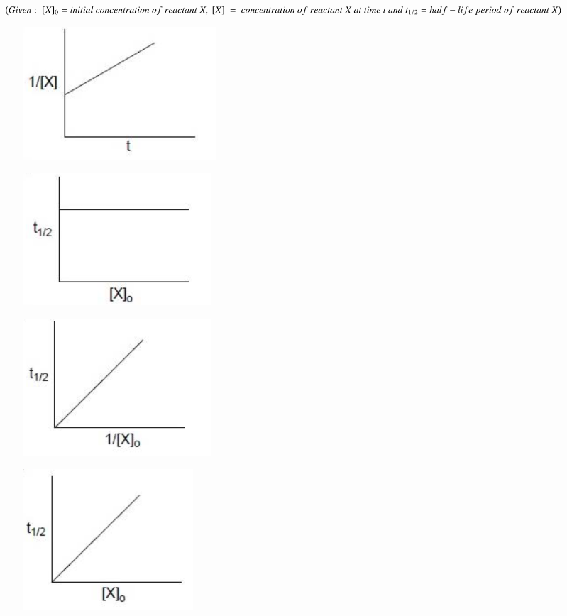 \documentclass[journal,12pt,onecolumn]{IEEEtran}
\begin{document}
\begin{enumerate}
$\brak{Given: \ [X]_0 =initial \ concentration \ of \ reactant \ X, \ [X] \ =  \ concentration \ of \ reactant \ X \ at \ time \ t \ and \ t_{1/2} = half-life \ period \ of \ reactant \ X}$
    \begin{enumerate}
	\begin{figure}[h!]
		\centering
	    \item \includegraphics{15a}
		    \caption*{}
		\label{fig:Q15a}
	\end{figure}
	\begin{figure}[h!]
		\centering
	    \item \includegraphics{15b}
		    \caption*{}
		\label{fig:Q15b}
	\end{figure}
	\begin{figure}[h!]
		\centering
	    \item \includegraphics{15c}
		    \caption*{}
		\label{fig:Q15c}
	\end{figure}
	\begin{figure}[h!]
		\centering
	    \item \includegraphics{15d}

\end{figure}
\end{enumerate}
\end{enumerate}
\end{document}
